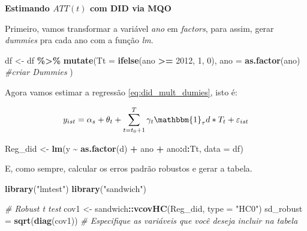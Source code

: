 \documentclass[portugues]{article}
\newenvironment{Shaded}{\begin{snugshade}}{\end{snugshade}}
\newcommand{\AttributeTok}[1]{\textcolor[rgb]{0.13,0.29,0.53}{#1}}
\newcommand{\CommentTok}[1]{\textcolor[rgb]{0.56,0.35,0.01}{\textit{#1}}}
\newcommand{\DecValTok}[1]{\textcolor[rgb]{0.00,0.00,0.81}{#1}}
\newcommand{\FunctionTok}[1]{\textcolor[rgb]{0.13,0.29,0.53}{\textbf{#1}}}
\newcommand{\NormalTok}[1]{#1}
\newcommand{\OtherTok}[1]{\textcolor[rgb]{0.56,0.35,0.01}{#1}}
\newcommand{\SpecialCharTok}[1]{\textcolor[rgb]{0.81,0.36,0.00}{\textbf{#1}}}
\newcommand{\StringTok}[1]{\textcolor[rgb]{0.31,0.60,0.02}{#1}}
\begin{document}
\begin{boxA}

    \textbf{Estimando $ATT(t)$ com DID via MQO}

    \vspace{5mm}

    Primeiro, vamos transformar a variável \textit{ano} em \textit{factors}, para assim, gerar \textit{dummies} pra cada ano com a função \textit{lm}.
    
    \begin{Shaded}
    \begin{Highlighting}[]
    \NormalTok{df }\OtherTok{\textless{}{-}}\NormalTok{ df }\SpecialCharTok{\%\textgreater{}\%} \FunctionTok{mutate}\NormalTok{(}\AttributeTok{Tt =} \FunctionTok{ifelse}\NormalTok{(ano }\SpecialCharTok{\textgreater{}=} \DecValTok{2012}\NormalTok{, }\DecValTok{1}\NormalTok{, }\DecValTok{0}\NormalTok{),}
                        \AttributeTok{ano =} \FunctionTok{as.factor}\NormalTok{(ano) }\CommentTok{\#criar Dummies}
    \NormalTok{                    )}
    \end{Highlighting}
    \end{Shaded}

    Agora vamos estimar a regressão \eqref{eq:did_mult_dumies}, isto é:

    $$     y_{ist} = \alpha_s + \theta_t + \sum_{t=t_0+1}^{T} \gamma_t  \mathbbm{1}_{\tau} d * T_t + \varepsilon_{ist}  $$

    \begin{Shaded}
    \begin{Highlighting}[]
    \NormalTok{Reg\_did }\OtherTok{\textless{}{-}} \FunctionTok{lm}\NormalTok{(y }\textasciitilde{} \FunctionTok{as.factor}\NormalTok{(d) }\SpecialCharTok{+}\NormalTok{ ano }\SpecialCharTok{+}\NormalTok{ ano}\SpecialCharTok{:}\NormalTok{d}\SpecialCharTok{:}\NormalTok{Tt, }
    \AttributeTok{data =}\NormalTok{ df)}
    \end{Highlighting}
    \end{Shaded}

    E, como sempre, calcular os erros padrão robustos e gerar a tabela.
    
    \begin{Shaded}
    \begin{Highlighting}[]
    \FunctionTok{library}\NormalTok{(}\StringTok{"lmtest"}\NormalTok{)}
    \FunctionTok{library}\NormalTok{(}\StringTok{"sandwich"}\NormalTok{)}

    \CommentTok{\# Robust t test}
    \NormalTok{cov1 }\OtherTok{\textless{}{-}}\NormalTok{ sandwich}\SpecialCharTok{::}\FunctionTok{vcovHC}\NormalTok{(Reg\_did, }\AttributeTok{type =} \StringTok{"HC0"}\NormalTok{)}
    \NormalTok{sd\_robust }\OtherTok{=} \FunctionTok{sqrt}\NormalTok{(}\FunctionTok{diag}\NormalTok{(cov1))}
    \CommentTok{\# Especifique as variáveis que você deseja incluir na tabela}


\end{Highlighting}
\end{Shaded}
\end{boxA}
\end{document}
